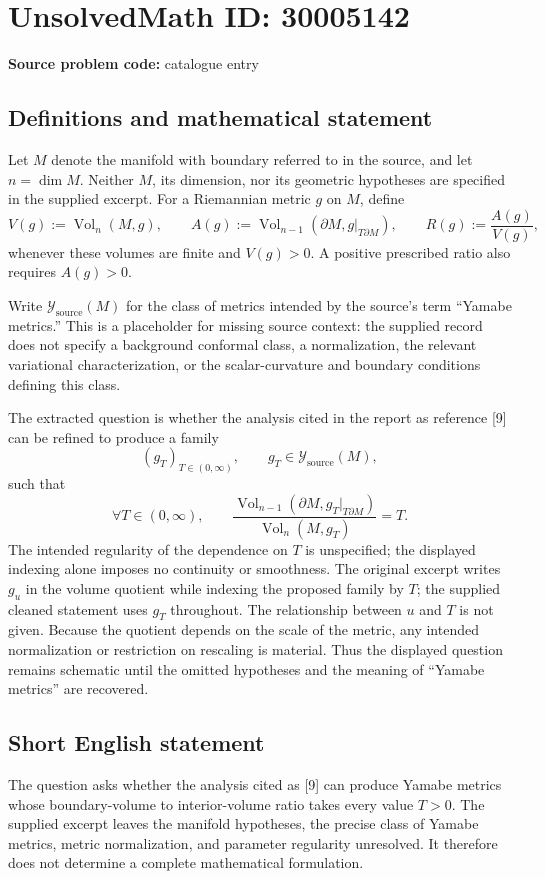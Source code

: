 \documentclass[11pt]{article}
\begin{document}
\section*{UnsolvedMath ID: 30005142}
\textbf{Source problem code:} catalogue entry
\subsection{Definitions and mathematical statement}
Let \(M\) denote the manifold with boundary referred to in the source, and let \(n=\dim M\). Neither \(M\), its dimension, nor its geometric hypotheses are specified in the supplied excerpt. For a Riemannian metric \(g\) on \(M\), define
\[
V(g):=\operatorname{Vol}_{n}(M,g),\qquad
A(g):=\operatorname{Vol}_{n-1}(\partial M,g|_{T\partial M}),\qquad
R(g):=\frac{A(g)}{V(g)},
\]
whenever these volumes are finite and \(V(g)>0\). A positive prescribed ratio also requires \(A(g)>0\).

Write \(\mathcal{Y}_{\mathrm{source}}(M)\) for the class of metrics intended by the source's term ``Yamabe metrics.'' This is a placeholder for missing source context: the supplied record does not specify a background conformal class, a normalization, the relevant variational characterization, or the scalar-curvature and boundary conditions defining this class.

The extracted question is whether the analysis cited in the report as reference [9] can be refined to produce a family
\[
(g_T)_{T\in(0,\infty)},\qquad g_T\in\mathcal{Y}_{\mathrm{source}}(M),
\]
such that
\[
\forall T\in(0,\infty),\qquad
\frac{\operatorname{Vol}_{n-1}(\partial M,g_T|_{T\partial M})}
{\operatorname{Vol}_{n}(M,g_T)}=T.
\]
The intended regularity of the dependence on \(T\) is unspecified; the displayed indexing alone imposes no continuity or smoothness. The original excerpt writes \(g_u\) in the volume quotient while indexing the proposed family by \(T\); the supplied cleaned statement uses \(g_T\) throughout. The relationship between \(u\) and \(T\) is not given. Because the quotient depends on the scale of the metric, any intended normalization or restriction on rescaling is material. Thus the displayed question remains schematic until the omitted hypotheses and the meaning of ``Yamabe metrics'' are recovered.
\subsection{Short English statement}
The question asks whether the analysis cited as [9] can produce Yamabe metrics whose boundary-volume to interior-volume ratio takes every value \(T>0\). The supplied excerpt leaves the manifold hypotheses, the precise class of Yamabe metrics, metric normalization, and parameter regularity unresolved. It therefore does not determine a complete mathematical formulation.
\end{document}
